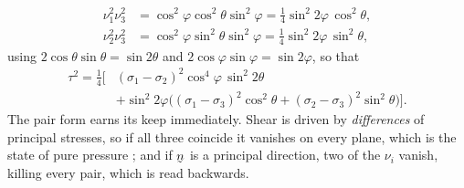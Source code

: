 \begin{solution}
\[\begin{aligned}
   \nu_{1}^{2}\nu_{3}^{2}
     &=\cos^{2}\varphi\cos^{2}\theta\sin^{2}\varphi
      =\tfrac14\sin^{2}2\varphi\,\cos^{2}\theta,\\
   \nu_{2}^{2}\nu_{3}^{2}
     &=\cos^{2}\varphi\sin^{2}\theta\sin^{2}\varphi
      =\tfrac14\sin^{2}2\varphi\,\sin^{2}\theta,
\end{aligned}
\]
using $2\cos\theta\sin\theta=\sin2\theta$ and
$2\cos\varphi\sin\varphi=\sin2\varphi$, so that
\[
\begin{aligned}
   \tau^{2}=\tfrac14\Big[&(\sigma_{1}-\sigma_{2})^{2}
     \cos^{4}\varphi\,\sin^{2}2\theta\\
   &+\sin^{2}2\varphi\Big((\sigma_{1}-\sigma_{3})^{2}\cos^{2}\theta
     +(\sigma_{2}-\sigma_{3})^{2}\sin^{2}\theta\Big)\Big].
\end{aligned}
\]
The pair form earns its keep immediately. Shear is driven by
\emph{differences} of principal stresses, so if all three coincide it
vanishes on every plane, which is the state of pure pressure
; and if $\bn$ is a principal direction, two of the $\nu_{i}$
vanish, killing every pair, which is  read backwards.


\end{solution}
